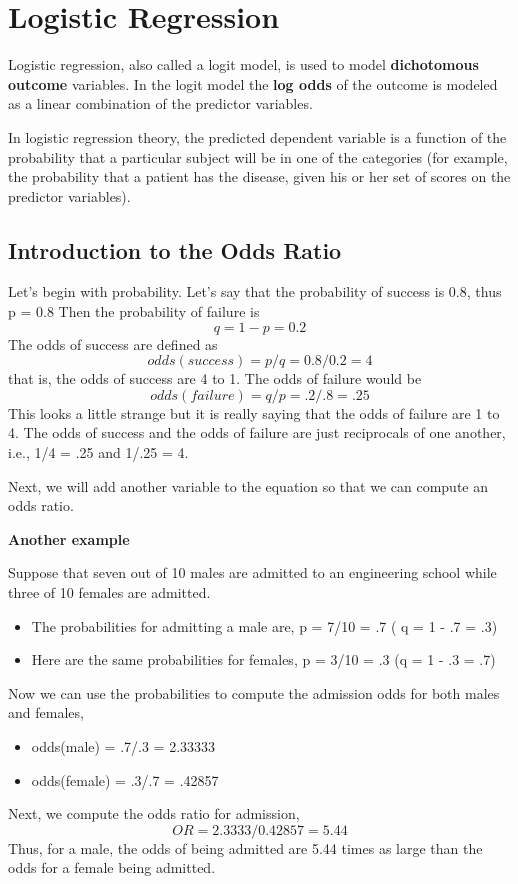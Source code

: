 \documentclass[a4paper,12pt]{article}
\begin{document}
\section{Logistic Regression}
Logistic regression, also called a logit model, is used to model \textbf{dichotomous outcome} variables. 
In the logit model the \textbf{log odds} of the outcome is modeled as a linear combination of the predictor variables.

In logistic regression theory, the predicted dependent variable is a function of the probability that a particular subject will be in one of the categories (for example, the probability that a patient has the disease, given his or her set of scores on the predictor variables).

\subsection{Introduction to the Odds Ratio}
Let's begin with probability.  Let's say that the probability of success is 0.8, thus
p = 0.8
Then the probability of failure is
\[q = 1 - p = 0.2\]
The odds of success are defined as
\[odds(success) = p/q = 0.8/0.2 = 4\]
that is, the odds of success are 4 to 1. The odds of failure would be
\[odds(failure) = q/p = .2/.8 = .25\]
This looks a little strange but it is really saying that the odds of failure are 1 to 4.  The odds of success and the odds of failure are just reciprocals of one another, i.e., 1/4 = .25 and 1/.25 = 4. 


 Next, we will add another variable to the equation so that we can compute an odds ratio.

\textbf{Another example}

Suppose that seven out of 10 males are admitted to an engineering school while three of 10 females are admitted. 

\begin{itemize}
\item The probabilities for admitting a male are,
p = 7/10 = .7      ( q = 1 - .7 = .3)
\item Here are the same probabilities for females,
p = 3/10 = .3       (q = 1 - .3 = .7)
\end{itemize}
Now we can use the probabilities to compute the admission odds for both males and females,
\begin{itemize}
\item odds(male) = .7/.3 = 2.33333
\item odds(female) = .3/.7 = .42857
\end{itemize}
Next, we compute the odds ratio for admission,
\[OR = 2.3333/0.42857 = 5.44\]
Thus, for a male, the odds of being admitted are 5.44 times as large than the odds for a female being admitted.
\end{document}
